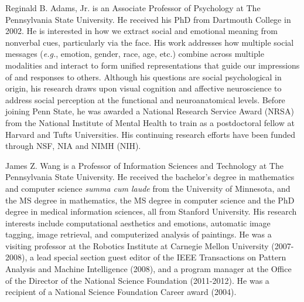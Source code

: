 \documentclass[10pt,journal,letterpaper,compsoc,twoside]{IEEEtran}
\begin{document}
\begin{IEEEbiography}{Reginald B. Adams, Jr.} is an Associate Professor of Psychology at The Pennsylvania State University. He received his PhD from Dartmouth College in 2002. He is interested in how we extract social and emotional meaning from nonverbal cues, particularly via the face. His work addresses how multiple social messages ({\it e.g.}, emotion, gender, race, age, etc.) combine across multiple modalities and interact to form unified representations that guide our impressions of and responses to others. Although his questions are social psychological in origin, his research draws upon visual cognition and affective neuroscience to address social perception at the functional and neuroanatomical levels. Before joining Penn State, he was awarded a National Research Service Award (NRSA) from the National Institute of Mental Health to train as a postdoctoral fellow at Harvard and Tufts Universities. His continuing research efforts have been funded through NSF, NIA and NIMH (NIH). 
\end{IEEEbiography}
\vspace{-0.25in}

\begin{IEEEbiography}{James Z. Wang} is a Professor of Information Sciences and Technology at The Pennsylvania State University. He received the bachelor's degree in mathematics and computer science {\it summa cum laude} from the University of Minnesota, and the MS degree in mathematics, the MS degree in computer science and the PhD degree in medical information sciences, all from Stanford University. His research interests include computational aesthetics and emotions, automatic image tagging, image retrieval, and computerized analysis of paintings. He was a visiting professor at the Robotics Institute at Carnegie Mellon University (2007-2008), a lead special section guest editor of the IEEE Transactions on Pattern Analysis and Machine Intelligence (2008), and a program manager at the Office of the Director of the National Science Foundation (2011-2012). He was a recipient of a National Science Foundation Career award (2004).
\end{IEEEbiography}

\end{document}
